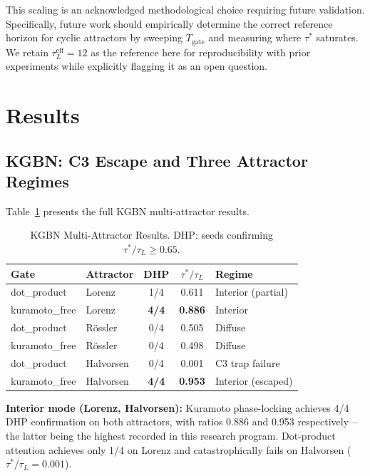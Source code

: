\documentclass[12pt]{article}
\theoremstyle{definition}
\begin{document}
This scaling is an acknowledged methodological choice requiring future validation. Specifically, future
work should empirically determine the correct reference horizon for cyclic attractors by sweeping
$T_{\text{gate}}$ and measuring where $\tau^*$ saturates. We retain $\tau_L^{\text{eff}} = 12$ as
the reference here for reproducibility with prior experiments while explicitly flagging it as an
open question.

\section{Results}
\label{sec:results}

\subsection{KGBN: C3 Escape and Three Attractor Regimes}

Table~\ref{tab:kgbn} presents the full KGBN multi-attractor results.

\begin{table}[h]
\centering
\caption{KGBN Multi-Attractor Results. DHP: seeds confirming $\tau^*/\tau_L \geq 0.65$.}
\label{tab:kgbn}
\begin{tabular}{llccl}
\toprule
Gate & Attractor & DHP & $\tau^*/\tau_L$ & Regime \\
\midrule
dot\_product   & Lorenz    & 1/4 & 0.611 & Interior (partial) \\
\rowcolor{gray!12}
kuramoto\_free & Lorenz    & \textbf{4/4} & \textbf{0.886} & Interior \\
dot\_product   & R\"{o}ssler   & 0/4 & 0.505 & Diffuse \\
\rowcolor{gray!12}
kuramoto\_free & R\"{o}ssler   & 0/4 & 0.498 & Diffuse \\
dot\_product   & Halvorsen & 0/4 & 0.001 & C3 trap failure \\
\rowcolor{gray!12}
kuramoto\_free & Halvorsen & \textbf{4/4} & \textbf{0.953} & Interior (escaped) \\
\bottomrule
\end{tabular}
\end{table}

\textbf{Interior mode (Lorenz, Halvorsen):} Kuramoto phase-locking achieves 4/4 DHP
confirmation on both attractors, with ratios 0.886 and 0.953 respectively---the latter
being the highest recorded in this research program. Dot-product attention achieves
only 1/4 on Lorenz and catastrophically fails on Halvorsen ($\tau^*/\tau_L = 0.001$).
\end{document}
